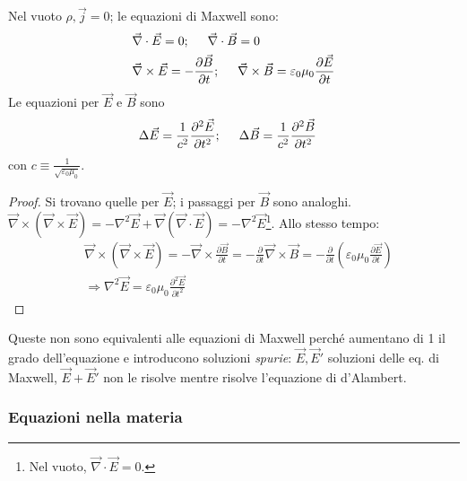 \documentclass[a4paper]{scrartcl}
\numberwithin{equation}{subsection}
\theoremstyle{style1}
\newenvironment{boxenv}[1][]{
    \begin{eqbox}[#1]
    }{
   \end{eqbox}
}
\begin{document}
Nel vuoto $\rho , \vec{j}=0$; le equazioni di Maxwell sono:
\begin{equation}
	\begin{split}
		& \vec{\nabla }\cdot \vec{E}=0; \hspace{.5cm} \vec{\nabla }\cdot \vec{B}=0\\
		&\vec{\nabla }\times \vec{E}=-\frac{\partial \vec{B}}{\partial t} ;\hspace{.5cm} \vec{\nabla }\times \vec{B}=\varepsilon _0 \mu_0 \frac{\partial \vec{E}}{\partial t} 
	\end{split}
\end{equation}
Le equazioni per $\vec{E}$ e $\vec{B}$ sono 
\begin{equation}
	\begin{split}
		&\Delta \vec{E} = \frac{1}{c^2}\frac{\partial ^2 \vec{E}}{\partial t^2}; \hspace{5mm} \Delta \vec{B}=\frac{1}{c^2} \frac{\partial ^2 \vec{B}}{\partial t^2} 
	\end{split}
\end{equation}
con $c\equiv \frac{1}{\sqrt{\varepsilon _0 \mu_0} }$. 
\begin{boxenv}[]
\begin{proof}
	Si trovano quelle per $\vec{E}$; i passaggi per $\vec{B}$ sono analoghi. $\vec{\nabla }\times (\vec{\nabla }\times \vec{E}) = - \nabla ^2 \vec{E} + \vec{\nabla }(\vec{\nabla }\cdot \vec{E})= -\nabla ^2 \vec{E}$\footnote{Nel vuoto, $\vec{\nabla }\cdot \vec{E}=0$.}. Allo stesso tempo:
	\[
		\begin{split}
			&\vec{\nabla }\times (\vec{\nabla }\times \vec{E}) = - \vec{\nabla }\times \frac{\partial \vec{B}}{\partial t} = - \frac{\partial }{\partial t} \vec{\nabla }\times \vec{B}= -\frac{\partial }{\partial t} \left(\varepsilon _0\mu_0\frac{\partial \vec{E}}{\partial t} \right) \\
	&\Rightarrow \nabla ^2 \vec{E}=\varepsilon _0 \mu_0 \frac{\partial ^2\vec{E}}{\partial t^2} 
		\end{split}
	\] 
	
\end{proof}
\end{boxenv}
\noindent Queste non sono equivalenti alle equazioni di Maxwell perch\'e aumentano di 1 il grado dell'equazione e introducono soluzioni \textit{spurie}: $\vec{E}, \vec{E}'$ soluzioni delle eq. di Maxwell, $\vec{E}+\vec{E}'$ non le risolve mentre risolve l'equazione di d'Alambert.


\subsubsection{Equazioni nella materia}
\end{document}
